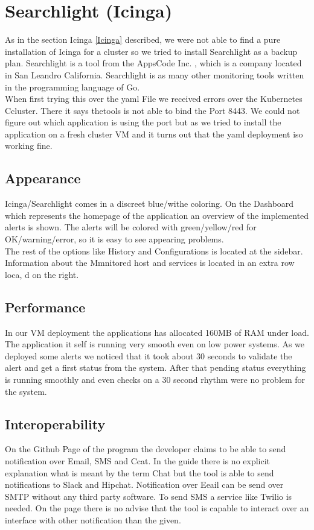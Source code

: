 \section{Searchlight (Icinga)}
\label{searchlight}
As in the section Icinga \ref{Icinga} described, we were not able to find a pure installation of Icinga for a cluster so we tried to install Searchlight as a backup plan.
Searchlight is a tool from the AppsCode Inc. \cite{appscode}, which is a company located in San Leandro California. 
Searchlight is as many other monitoring tools written in the programming language of Go.
\\
When first trying this over the yaml File we received errors over the Kubernetes Ccluster. There it says thetools is not able to bind the Port 8443. We could not figure out which application is using the port but as we tried to install the application on a fresh cluster VM and it turns out that the yaml deployment iso working fine.               \subsection{Appearance}
Icinga/Searchlight comes in a  discreet blue/withe coloring. On the Dashboard which represents the homepage of the application an overview of the implemented alerts is shown. The alerts will be colored with green/yellow/red for OK/warning/error, so it is easy to see appearing problems.\\
 The rest of the options like History and Configurations is located at the sidebar. Information about the Mmnitored host and services is located in an extra row loca, d on the right.
\subsection{Performance}
In our VM deployment the applications has allocated 160MB of RAM under load. The application it self is running very smooth even on low power systems. As we deployed some alerts we noticed that it took about 30 seconds to validate the alert and get a first status from the system. After that pending status everything is running smoothly and even checks on a 30 second rhythm were no problem for the system.
\subsection{Interoperability}
On the Github Page \cite{searchlight} of the program the developer claims to be able to send notification over Email, SMS and Ccat.
In the guide there is no explicit explanation what is meant by the term Chat but the tool is able to send notifications to Slack \cite{slack} and Hipchat. Notification over Eeail can be send over SMTP without any third party software. To send SMS a service like Twilio \cite{twilio} is needed.
On the page there is no advise that the tool is capable to interact over an interface with other notification than the given. 
